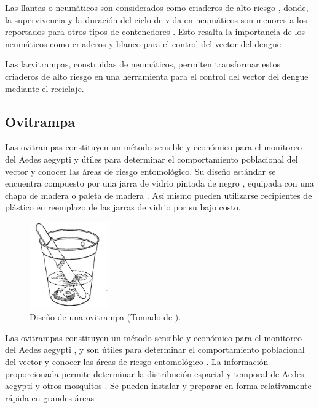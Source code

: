 Las llantas o neumáticos son considerados como criaderos de alto riesgo
\cite{bisset2008distribucion, manrique1998desarrollo, ulloa1996abundancia}, donde, la
supervivencia y la duración del ciclo de vida en neumáticos son menores a los reportados para
otros tipos de contenedores \cite{manrique1998desarrollo}. Esto resalta la importancia de los
neumáticos como criaderos y blanco para el control del vector del dengue \cite{manrique1998desarrollo, ulloa1996abundancia}.

Las larvitrampas, construidas de neumáticos, permiten transformar estos criaderos de alto
riesgo en una herramienta para el control del vector del dengue mediante el reciclaje.

\subsection{Ovitrampa}
\label{sec:densidad-vectorial-ovitrampa}
Las ovitrampas constituyen un método sensible y económico para el monitoreo del Aedes aegypti y
útiles para determinar el comportamiento poblacional del vector y conocer las áreas de riesgo
entomológico\cite{cenaprece2013}. Su diseño estándar se encuentra compuesto por una jarra de
vidrio pintada de negro \cite{dengueUruguayCap1, world2009dengue}, equipada con una chapa de
madera o paleta de madera \cite{dengueUruguayCap1, world2009dengue, website:TimothyOvitrap2014,
manualControlArg2009}. Así mismo pueden utilizarse recipientes de plástico
\cite{website:TimothyOvitrap2014, cenaprece2013, manualControlArg2009, MARQUES1993} en reemplazo
de las jarras de vidrio por su bajo costo.


\begin{figure}[!htbp]
\centering
\includegraphics[width=0.3\textwidth]{capitulo-3/graphics/ovitrampa.jpg}
\caption{\label{fig:cap3-larvitrampas} Diseño de una ovitrampa (Tomado de
\cite{website:TimothyOvitrap2014}).}
\end{figure}

Las ovitrampas constituyen un método sensible y económico para el monitoreo del Aedes aegypti
\cite{cenaprece2013, world2009dengue}, y son útiles para determinar el comportamiento poblacional
del vector y conocer las áreas de riesgo entomológico \cite{cenaprece2013}. La información
proporcionada permite determinar la distribución espacial y temporal de Aedes aegypti y otros
mosquitos \cite{dengueUruguayCap1, NINO2011}. Se pueden instalar y preparar en forma relativamente
rápida en grandes áreas \cite{world2009dengue}.



